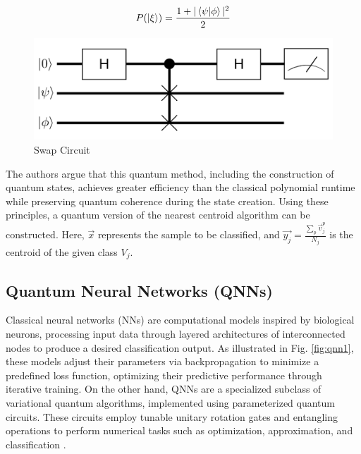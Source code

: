 \documentclass{article}
\begin{document}
\begin{equation}
    P(\ket{\xi}) = \frac{1 + |\braket{\psi | \phi}|^2}{2}
    \label{eq:3}
\end{equation}

\begin{figure}[h!]
  \centering
  \includegraphics[scale=0.15]{figures/swap.png}
  \caption{Swap Circuit}
  \label{fig:swap}
\end{figure}

The authors argue that this quantum method, including the construction of quantum states, achieves greater efficiency than the classical polynomial runtime while preserving quantum coherence during the state creation.
Using these principles, a quantum version of the nearest centroid algorithm can be constructed. Here, $\vec{x}$ represents the sample to be classified, and $\vec{y_j} = \frac{\sum_p \vec{v}^p_j}{N_j}$ is the centroid of the given class $V_j$. 


\subsection*{Quantum Neural Networks (QNNs)}
Classical neural networks (NNs) are computational models inspired by biological neurons, processing input data through layered architectures of interconnected nodes to produce a desired classification output. As illustrated in Fig. \ref{fig:qnn1}, these models adjust their parameters via backpropagation to minimize a predefined loss function, optimizing their predictive performance through iterative training. On the other hand, QNNs are a specialized subclass of variational quantum algorithms, implemented using parameterized quantum circuits. These circuits employ tunable unitary rotation gates and entangling operations to perform numerical tasks such as optimization, approximation, and classification \cite{kwak2021quantumneuralnetworksconcepts}.
\end{document}
